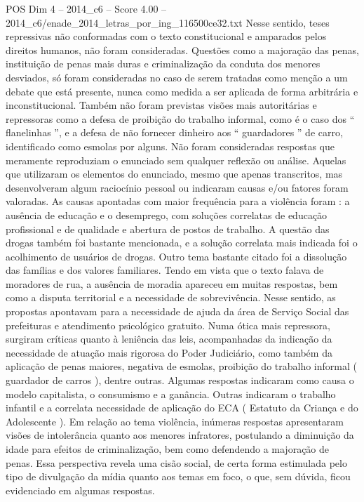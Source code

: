 \begin{textsample}{POS Dim 4 – 2014\_c6 – Score 4.00 – 2014\_c6/enade\_2014\_letras\_por\_ing\_116500ce32.txt}
Nesse sentido, teses repressivas não conformadas com o texto constitucional e amparados pelos direitos humanos, não foram consideradas.
Questões como a majoração das penas, instituição de penas mais duras e criminalização da conduta dos menores desviados, só foram consideradas no caso de serem tratadas como menção a um debate que está presente, nunca como medida a ser aplicada de forma arbitrária e inconstitucional.
Também não foram previstas visões mais autoritárias e repressoras como a defesa de proibição do trabalho informal, como é o caso dos “ flanelinhas ”, e a defesa de não fornecer dinheiro aos “ guardadores ” de carro, identificado como esmolas por alguns.
Não foram consideradas respostas que meramente reproduziam o enunciado sem qualquer reflexão ou análise.
Aquelas que utilizaram os elementos do enunciado, mesmo que apenas transcritos, mas desenvolveram algum raciocínio pessoal ou indicaram causas e/ou fatores foram valoradas.
As causas apontadas com maior frequência para a violência foram : a ausência de educação e o desemprego, com soluções correlatas de educação profissional e de qualidade e abertura de postos de trabalho.
A questão das drogas também foi bastante mencionada, e a solução correlata mais indicada foi o acolhimento de usuários de drogas.
Outro tema bastante citado foi a dissolução das famílias e dos valores familiares.
Tendo em vista que o texto falava de moradores de rua, a ausência de moradia apareceu em muitas respostas, bem como a disputa territorial e a necessidade de sobrevivência.
Nesse sentido, as propostas apontavam para a necessidade de ajuda da área de Serviço Social das prefeituras e atendimento psicológico gratuito.
Numa ótica mais repressora, surgiram críticas quanto à leniência das leis, acompanhadas da indicação da necessidade de atuação mais rigorosa do Poder Judiciário, como também da aplicação de penas maiores, negativa de esmolas, proibição do trabalho informal ( guardador de carros ), dentre outras.
Algumas respostas indicaram como causa o modelo capitalista, o consumismo e a ganância.
Outras indicaram o trabalho infantil e a correlata necessidade de aplicação do ECA ( Estatuto da Criança e do Adolescente ).
Em relação ao tema violência, inúmeras respostas apresentaram visões de intolerância quanto aos menores infratores, postulando a diminuição da idade para efeitos de criminalização, bem como defendendo a majoração de penas.
Essa perspectiva revela uma cisão social, de certa forma estimulada pelo tipo de divulgação da mídia quanto aos temas em foco, o que, sem dúvida, ficou evidenciado em algumas respostas.

\end{textsample}
